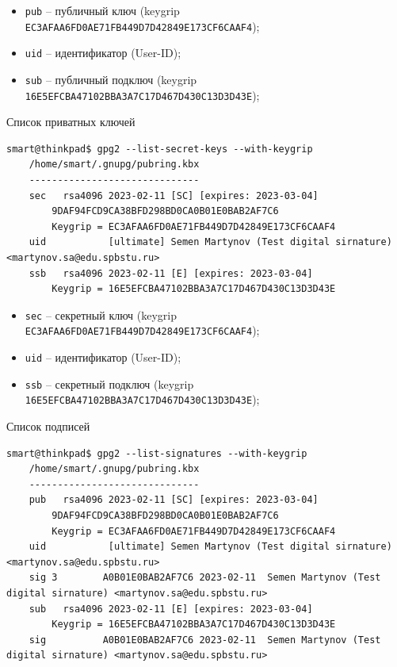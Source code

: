 \begin{itemize}
    \item \texttt{pub} -- публичный ключ (keygrip \texttt{EC3AFAA6FD0AE71FB449D7D42849E173CF6CAAF4});
    \item \texttt{uid} -- идентификатор (User-ID);
    \item \texttt{sub} -- публичный подключ (keygrip \texttt{16E5EFCBA47102BBA3A7C17D467D430C13D3D43E});
\end{itemize}

Список приватных ключей
\begin{Verbatim}[frame=single,breaklines=true,breakanywhere=true]
    smart@thinkpad$ gpg2 --list-secret-keys --with-keygrip
    /home/smart/.gnupg/pubring.kbx
    ------------------------------
    sec   rsa4096 2023-02-11 [SC] [expires: 2023-03-04]
        9DAF94FCD9CA38BFD298BD0CA0B01E0BAB2AF7C6
        Keygrip = EC3AFAA6FD0AE71FB449D7D42849E173CF6CAAF4
    uid           [ultimate] Semen Martynov (Test digital sirnature) <martynov.sa@edu.spbstu.ru>
    ssb   rsa4096 2023-02-11 [E] [expires: 2023-03-04]
        Keygrip = 16E5EFCBA47102BBA3A7C17D467D430C13D3D43E
\end{Verbatim}

\begin{itemize}
    \item \texttt{sec} -- секретный ключ (keygrip \texttt{EC3AFAA6FD0AE71FB449D7D42849E173CF6CAAF4});
    \item \texttt{uid} -- идентификатор (User-ID);
    \item \texttt{ssb} -- секретный подключ (keygrip \texttt{16E5EFCBA47102BBA3A7C17D467D430C13D3D43E});
\end{itemize}

Список подписей
\begin{Verbatim}[frame=single,breaklines=true,breakanywhere=true]
    smart@thinkpad$ gpg2 --list-signatures --with-keygrip
    /home/smart/.gnupg/pubring.kbx
    ------------------------------
    pub   rsa4096 2023-02-11 [SC] [expires: 2023-03-04]
        9DAF94FCD9CA38BFD298BD0CA0B01E0BAB2AF7C6
        Keygrip = EC3AFAA6FD0AE71FB449D7D42849E173CF6CAAF4
    uid           [ultimate] Semen Martynov (Test digital sirnature) <martynov.sa@edu.spbstu.ru>
    sig 3        A0B01E0BAB2AF7C6 2023-02-11  Semen Martynov (Test digital sirnature) <martynov.sa@edu.spbstu.ru>
    sub   rsa4096 2023-02-11 [E] [expires: 2023-03-04]
        Keygrip = 16E5EFCBA47102BBA3A7C17D467D430C13D3D43E
    sig          A0B01E0BAB2AF7C6 2023-02-11  Semen Martynov (Test digital sirnature) <martynov.sa@edu.spbstu.ru>
\end{Verbatim}

